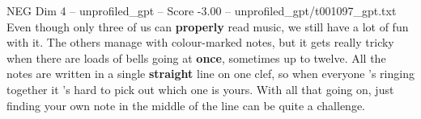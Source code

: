 \begin{textsample}{NEG Dim 4 – unprofiled\_gpt – Score -3.00 – unprofiled\_gpt/t001097\_gpt.txt}  \label{ex:f4_neg_024}
Even though only three of us can \textbf{properly} read music, we still have a lot of fun with it.
The others manage with colour-marked notes, but it gets really tricky when there are loads of bells going at \textbf{once}, sometimes up to twelve.
All the notes are written in a single \textbf{straight} line on one clef, so when everyone ’s ringing together it ’s hard to pick out which one is yours.
With all that going on, just finding your own note in the middle of the line can be quite a challenge.

\end{textsample}

